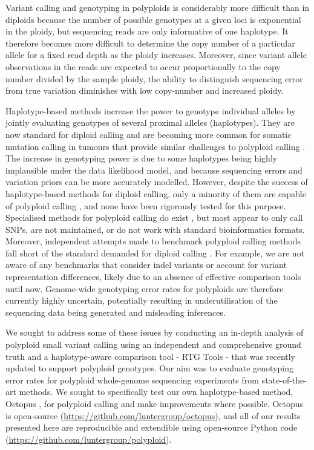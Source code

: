\documentclass[notitlepage, twocolumn, 10pt]{article}
\begin{document}
Variant calling and genotyping in polyploids is considerably more difficult than in diploids because the number of possible genotypes at a given loci is exponential in the ploidy, but sequencing reads are only informative of one haplotype. It therefore becomes more difficult to determine the copy number of a particular allele for a fixed read depth as the ploidy increases. Moreover, since variant allele observations in the reads are expected to occur proportionally to the copy number divided by the sample ploidy, the ability to distinguish sequencing error from true variation diminishes with low copy-number and increased ploidy.

Haplotype-based methods increase the power to genotype individual alleles by jointly evaluating genotypes of several proximal alleles (haplotypes). They are now standard for diploid calling \cite{RN663, RN598, RN538, RN604, RN619} and are becoming more common for somatic mutation calling in tumours that provide similar challenges to polyploid calling \cite{RN663}. The increase in genotyping power is due to some haplotypes being highly implausible under the data likelihood model, and because sequencing errors and variation priors can be more accurately modelled. However, despite the success of haplotype-based methods for diploid calling, only a minority of them are capable of polyploid calling \cite{RN663, RN598, RN538}, and none have been rigorously tested for this purpose. Specialised methods for polyploid calling do exist \cite{RN662}, but most appear to only call SNPs, are not maintained, or do not work with standard bioinformatics formats. Moreover, independent attempts made to benchmark polyploid calling methods fall short of the standard demanded for diploid calling \cite{RN655, RN656}. For example, we are not aware of any benchmarks that consider indel variants or account for variant representation differences, likely due to an absence of effective comparison tools until now. Genome-wide genotyping error rates for polyploids are therefore currently highly uncertain, potentially resulting in underutilisation of the sequencing data being generated and misleading inferences.

We sought to address some of these issues by conducting an in-depth analysis of polyploid small variant calling using an independent and comprehensive ground truth and a haplotype-aware comparison tool - RTG Tools \cite{RN169} - that was recently updated to support polyploid genotypes. Our aim was to evaluate genotyping error rates for polyploid whole-genome sequencing experiments from state-of-the-art methods. We sought to specifically test our own haplotype-based method, Octopus \cite{RN663}, for polyploid calling and make improvements where possible. Octopus is open-source (\url{https://github.com/luntergroup/octopus}), and all of our results presented here are reproducible and extendible using open-source Python code (\url{https://github.com/luntergroup/polyploid}).
\end{document}
